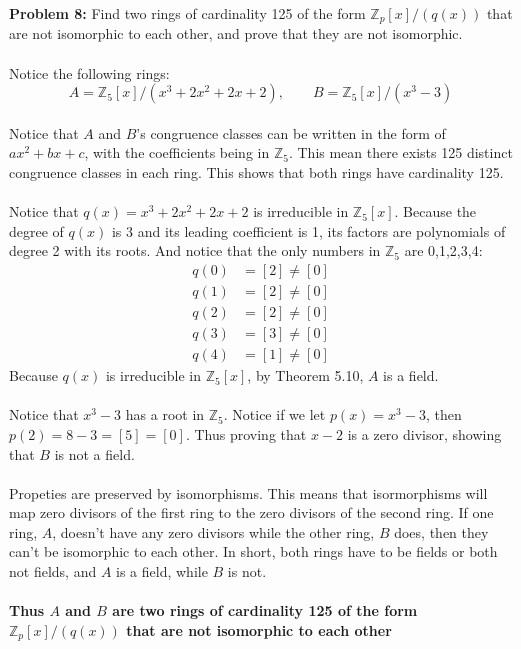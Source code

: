 \documentclass[12pt]{article}
\begin{document}
\noindent \textbf{Problem 8: }Find two rings of cardinality 125 of the form $\mathbb{Z}_p[x]/(q(x))$ that are not
isomorphic to each other, and prove that they are not isomorphic.
\\ \\
Notice the following rings:
	$$
	A = \mathbb{Z}_5[x]/(x^3 + 2x^2 + 2x + 2), \qquad B = \mathbb{Z}_5[x]/(x^3 - 3)
	$$
\\
Notice that $A$ and $B$'s congruence classes can be written in the form of $ax^2 + bx + c$, with the coefficients being in $\mathbb{Z}_5$.  This mean there exists 125 distinct congruence classes in each ring. This shows that both rings have cardinality 125.
\\ \\
Notice that $q(x) = x^3 + 2x^2 + 2x + 2$ is irreducible in $\mathbb{Z}_5[x]$. Because the degree of $q(x)$ is 3 and its leading coefficient is 1, its factors are polynomials of degree 2 with its roots. And notice that the only numbers in $\mathbb{Z}_5$ are 0,1,2,3,4:
	\begin{align*}
		q(0) &= [2] \not = [0] \\
		q(1) &= [2] \not = [0] \\
		q(2) &= [2] \not = [0] \\
		q(3) &= [3] \not = [0] \\
		q(4) &= [1] \not = [0] 
	\end{align*}
Because $q(x)$ is irreducible in $\mathbb{Z}_5[x]$, by Theorem 5.10, $A$ is a field.
\\ \\
Notice that $x^3 - 3$ has a root in $\mathbb{Z}_5$.  Notice if we let $p(x) = x^3 - 3$, then $p(2) = 8 - 3 = [5] = [0]$.  Thus proving that $x - 2$ is a zero divisor, showing that $B$ is not a field.
\\ \\
Propeties are preserved by isomorphisms.  This means that isormorphisms will map zero divisors of the first ring to the zero divisors of the second ring.  If one ring, $A$, doesn't have any zero divisors while the other ring, $B$ does, then they can't be isomorphic to each other. In short, both rings have to be fields or both not fields, and $A$ is a field, while $B$ is not.
\\ \\
\textbf{\boldmath Thus $A$ and $B$ are two rings of cardinality 125 of the form $\mathbb{Z}_p[x]/(q(x))$ that are not isomorphic to each other}

\newpage
\end{document}
